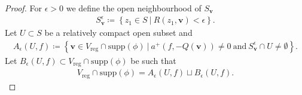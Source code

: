 \documentclass[twoside,a4paper,10pt]{article} %
\newcommand{\8}{\infty}
\newcommand{\vbf}{\mathbf{v}}
\newcommand{\reg}{\mathrm{reg}}
\newcommand{\supp}{\mathrm{supp}}
\theoremstyle{mytheoremstyle}
\theoremstyle{remark}
\numberwithin{equation}{section}
\begin{document}
\begin{proof}
 For $\epsilon>0$ we define the open neighbourhood of $S_\vbf$
\begin{align}
S_\vbf^\epsilon \coloneqq \left \{ z_1 \in S \ \vert \  R(z_1,\vbf) < \epsilon \right \}.
\end{align}
Let $U \subset S$ be a relatively compact open subset and
\begin{align}
A_\epsilon(U,f) \coloneqq \left \{ \vbf \in V_\reg \cap \supp(\phi) \ \vert \ a^+(f,-Q(\vbf)) \neq 0 \ \textrm{and} \ S_\vbf^\epsilon \cap U \neq \emptyset \right \}.
\end{align}
Let $B_\epsilon(U,f) \subset V_\reg \cap \supp(\phi)$ be such that
\begin{align}
V_\reg \cap \supp(\phi) =A_\epsilon(U,f) \sqcup B_\epsilon(U,f).
\end{align}



\end{proof}
\end{document}
